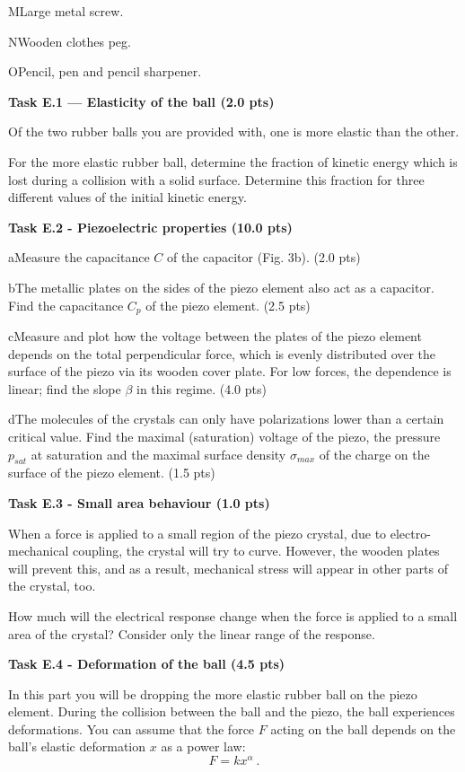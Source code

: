 M\quad Large metal screw.

N\quad Wooden clothes peg.

O\quad Pencil, pen and pencil sharpener.

\textbf{Task E.1 — Elasticity of the ball (2.0 pts)}

Of the two rubber balls you are provided with, one is more elastic than the
other.

For the more elastic rubber ball, determine the fraction of kinetic energy
which is lost during a collision with a solid surface. Determine this fraction
for three different values of the initial kinetic energy.

\textbf{Task E.2 - Piezoelectric properties (10.0 pts)}

a\quad Measure the capacitance $C$ of the capacitor (Fig. 3b). (2.0 pts)

b\quad The metallic plates on the sides of the piezo element also act as a
capacitor. Find the capacitance $C_p$ of the piezo element. (2.5 pts)

c\quad Measure and plot how the voltage between the plates of the piezo element
depends on the total perpendicular force, which is evenly distributed over the
surface of the piezo via its wooden cover plate. For low forces, the dependence
is linear; find the slope $\beta$ in this regime. (4.0 pts)

d\quad The molecules of the crystals can only have polarizations lower than a
certain critical value. Find the maximal (saturation) voltage of the piezo, the
pressure $p_{sat}$ at saturation and the maximal surface density
$\sigma_{max}$ of the charge on the surface of the piezo element. (1.5 pts)

\textbf{Task E.3 - Small area behaviour (1.0 pts)}

When a force is applied to a small region of the piezo crystal, due to
electro-mechanical coupling, the crystal will try to curve. However, the wooden
plates will prevent this, and as a result, mechanical stress will appear in
other parts of the crystal, too.

How much will the electrical response change when the force is applied to a
small area of the crystal? Consider only the linear range of the response.

\textbf{Task E.4 - Deformation of the ball (4.5 pts)}

In this part you will be dropping the more elastic rubber ball on the piezo
element. During the collision between the ball and the piezo, the ball
experiences deformations. You can assume that the force $F$ acting on the ball
depends on the ball's elastic deformation $x$ as a power law:
\begin{equation}
F = kx^\alpha \ . \tag{1}
\end{equation}

